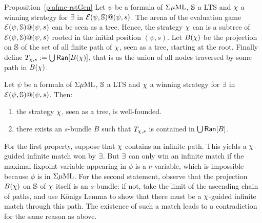 \begin{proofof}{Proposition~\ref{p:afmc-rstGen}}
Let $\psi$ be a formula of $\Sigma\mu\mathrm{ML}$, $\mathbb{S}$ a LTS and $\chi$ a winning strategy for $\exists$ in $\mathcal{E}(\psi,\mathbb{S})@(\psi,s)$.  The arena of  the evaluation game $\mathcal{E}(\psi,\mathbb{S})@(\psi,s)$ can be seen as a tree. Hence, 
the strategy  $\chi$ can is a subtree of $\mathcal{E}(\psi,\mathbb{S})@(\psi,s)$ rooted in the initial position $(\psi,s)$. Let $B(\chi)$ be the projection on $\mathbb{S}$ of the set of all finite path of  $\chi$, seen as a tree, starting at the root. Finally define $T_{\chi,s}:=\bigcup \mathsf{Ran}[B(\chi)]$, that is as the union of all nodes traversed by some path in $B(\chi)$.
%
\begin{claimfirst}\label{p:strategybundledEv}
Let $\psi$ be a formula of $\Sigma\mu\mathrm{ML}$, $\mathbb{S}$ a LTS and $\chi$ a winning strategy for $\exists$ in $\mathcal{E}(\psi,\mathbb{S})@(\psi,s)$. Then: 
\begin{enumerate}
\item the strategy $\chi$, seen as a tree, is well-founded.
\item there exists an $s$-bundle $B$ such that $T_{\chi,s}$ is contained in $\bigcup \mathsf{Ran}[B]$.
\end{enumerate}
\end{claimfirst}
\begin{pfclaim}
For the first property, suppose that $\chi$ contains an infinite path. This yields a $\chi$-guided infinite match won by $\exists$. But $\exists$ can only win an infinite match if the maximal fixpoint variable appearing in $\phi$ is a $\nu$-variable, which is impossible because $\phi$ is in $\Sigma\mu\mathrm{ML}$. %
%
For the second statement, observe that the projection $B(\chi)$ on $\mathbb{S}$ of $\chi$ itself is an $s$-bundle: if not, take the limit of the ascending chain of paths, and use K\"{o}nigs Lemma to show that there must be a $\chi$-guided infinite match through this path. The existence of such a match leads to a contradiction for the same reason as above.
\end{pfclaim}
%
%
%
%

\end{proofof}

